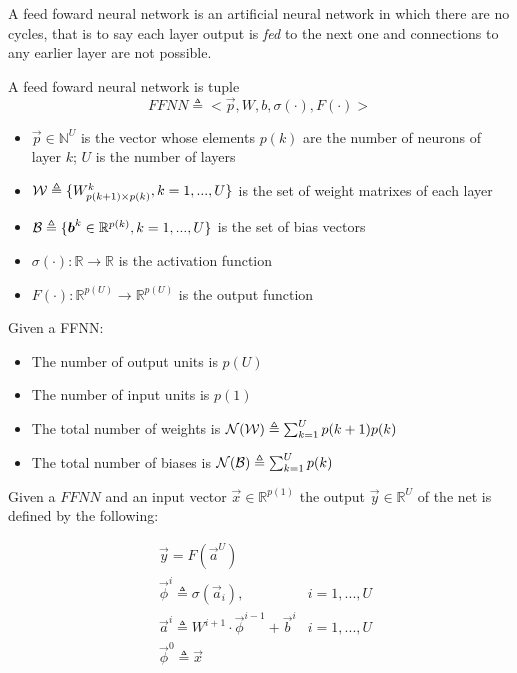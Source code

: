 
A feed foward neural network is an artificial neural network in which there are no cycles, that is to say each layer output is \textit{fed} to the next one and connections to any earlier layer are not possible. 


\begin{defn}
\label{def_ffnn}
A feed foward neural network is tuple
$$FFNN\triangleq<\vec{p},W,b,\sigma(\cdot),F(\cdot)>$$
\begin{itemize}
 \item $\vec{p} \in \mathbb{N}^U$ is the vector whose elements $p(k)$ are the number of neurons of layer $k$; $U$ is the number of layers
 \item $\mathcal{W} \triangleq \{W^k_{p(k+1) \times p(k)}, k=1,...,U \}$ is the set of weight matrixes of each layer
 \item $\mathcal{B} \triangleq \{\boldsymbol{b}^k \in \mathbb{R}^{p(k)}, k=1,...,U \} $ is the set of bias vectors
 \item $\sigma(\cdot): \mathbb{R}\rightarrow \mathbb{R}$ is the activation function
 \item $F(\cdot): \mathbb{R}^{p(U)}\rightarrow \mathbb{R}^{p(U)}$ is the output function
\end{itemize}
\end{defn}

\begin{remark}{}
Given a FFNN:
\begin{itemize}
 \item The number of output units is $p(U)$
 \item The number of input units is $p(1)$
 \item The total number of weights is $\mathcal{N}(\mathcal{W}) \triangleq \sum_{k=1}^U p(k+1)p(k)$
 \item The total number of biases is $\mathcal{N}(\mathcal{B}) \triangleq \sum_{k=1}^U p(k)$
\end{itemize}
\end{remark}

\begin{defn}
Given a $FFNN$ and an input vector $\vec{x} \in \mathbb{R}^{p(1)}$ the output $\vec{y} \in \mathbb{R}^U$ of the net is defined by the following:

\begin{align}
&\vec{y}=F(\vec{a}^{U}) &\\
&\vec{\phi}^{i} \triangleq \sigma(\vec{a}_{i}), & i=1,...,U\\
&\vec{a}^{i} \triangleq W^{i+1} \cdot \vec{\phi}^{i-1} +\vec{b}^i  & i=1,...,U\\
&\vec{\phi}^{0} \triangleq \vec{x} &
\end{align}
\end{defn}


